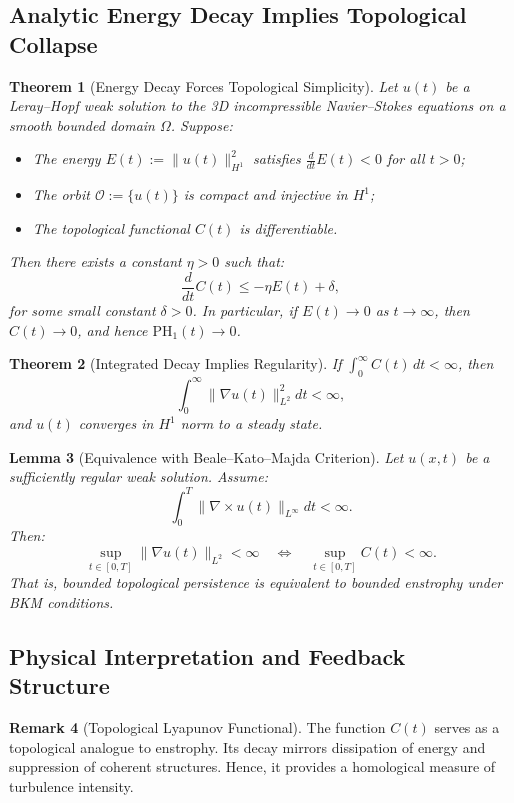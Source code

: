 \documentclass[11pt]{article}
\newtheorem{theorem}{Theorem}[section]
\newtheorem{lemma}[theorem]{Lemma}
\theoremstyle{definition}
\newtheorem{remark}[theorem]{Remark}
\begin{document}
\subsection{Analytic Energy Decay Implies Topological Collapse}

\begin{theorem}[Energy Decay Forces Topological Simplicity]
Let $u(t)$ be a Leray--Hopf weak solution to the 3D incompressible Navier--Stokes equations on a smooth bounded domain $\Omega$. Suppose:
\begin{itemize}
    \item The energy $E(t) := \|u(t)\|_{H^1}^2$ satisfies $\frac{d}{dt} E(t) < 0$ for all $t > 0$;
    \item The orbit $\mathcal{O} := \{ u(t) \}$ is compact and injective in $H^1$;
    \item The topological functional $C(t)$ is differentiable.
\end{itemize}
Then there exists a constant $\eta > 0$ such that:
\[
\frac{d}{dt} C(t) \leq -\eta E(t) + \delta,
\]
for some small constant $\delta > 0$. In particular, if $E(t) \to 0$ as $t \to \infty$, then $C(t) \to 0$, and hence $\mathrm{PH}_1(t) \to 0$.
\end{theorem}

\begin{theorem}[Integrated Decay Implies Regularity]
If $\int_0^\infty C(t)\,dt < \infty$, then
\[
\int_0^\infty \|\nabla u(t)\|_{L^2}^2 dt < \infty,
\]
and $u(t)$ converges in $H^1$ norm to a steady state.
\end{theorem}

\begin{lemma}[Equivalence with Beale--Kato--Majda Criterion]
Let $u(x,t)$ be a sufficiently regular weak solution. Assume:
\[
\int_0^T \|\nabla \times u(t)\|_{L^\infty} dt < \infty.
\]
Then:
\[
\sup_{t \in [0,T]} \|\nabla u(t)\|_{L^2} < \infty \quad \Leftrightarrow \quad \sup_{t \in [0,T]} C(t) < \infty.
\]
That is, bounded topological persistence is equivalent to bounded enstrophy under BKM conditions.
\end{lemma}

\subsection{Physical Interpretation and Feedback Structure}

\begin{remark}[Topological Lyapunov Functional]
The function $C(t)$ serves as a topological analogue to enstrophy. Its decay mirrors dissipation of energy and suppression of coherent structures. Hence, it provides a homological measure of turbulence intensity.
\end{remark}
\end{document}
